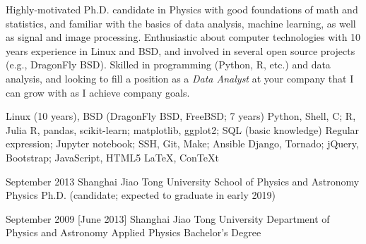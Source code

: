 \documentclass{resume}
\newcommand{\myposition}{Data Analyst}
\begin{document}
\makeheader

Highly-motivated Ph.D. candidate in Physics with good foundations of math
and statistics, and familiar with the basics of data analysis, machine
learning, as well as signal and image processing.
Enthusiastic about computer technologies with 10 years experience
in Linux and BSD, and involved in several open source projects (e.g.,
DragonFly BSD).
Skilled in programming (Python, R, etc.) and data analysis,
and looking to fill a position as a \emph{\myposition} at your company
that I can grow with as I achieve company goals.

\begin{competences}[10em]
    {Linux (10 years), BSD (DragonFly BSD, FreeBSD; 7 years)}
    {Python, Shell, C; R, Julia}
    {R, pandas, scikit-learn; matplotlib, ggplot2; SQL (basic knowledge)}
    {Regular expression; Jupyter notebook; SSH, Git, Make; Ansible}
    {Django, Tornado; jQuery, Bootstrap; JavaScript, HTML5}
    {\LaTeX, Con\TeX{}t}
\end{competences}

\begin{educations}
  \education%
    {September 2013}%
    {Shanghai Jiao Tong University}%
    {School of Physics and Astronomy}%
    {Physics}%
    {Ph.D. (candidate; expected to graduate in early 2019)}

  \separator{0.5em}
  \education%
    {September 2009}%
    [June 2013]%
    {Shanghai Jiao Tong University}%
    {Department of Physics and Astronomy}%
    {Applied Physics}%
    {Bachelor's Degree}
\end{educations}
\end{document}
